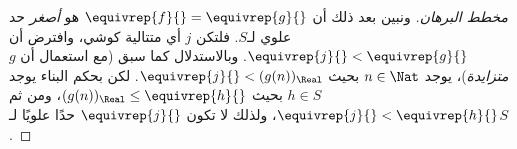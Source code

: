 \documentclass[../../../include/open-logic-section]{subfiles}
\begin{document}
\begin{proof}[مخطط البرهان]
ونبين بعد ذلك أن $\equivrep{f}{} = \equivrep{g}{}$ هو \emph{أصغر}
حد علوي لـ$S$. فلتكن $j$ أي متتالية كوشي، وافترض أن $\equivrep{j}{} <
\equivrep{g}{}$. وبالاستدلال كما سبق (مع استعمال أن $g$
\emph{متزايدة})، يوجد $n \in \Nat$ بحيث $\equivrep{j}{} <
(g(n))_\Real$. لكن بحكم البناء يوجد $h \in S$ بحيث
$(g(n))_\Real \leq \equivrep{h}{}$، ومن ثم $\equivrep{j}{} <
\equivrep{h}{}$، ولذلك لا تكون $\equivrep{j}{}$ حدًا علويًا لـ$S$.
\end{proof}
\end{document}
